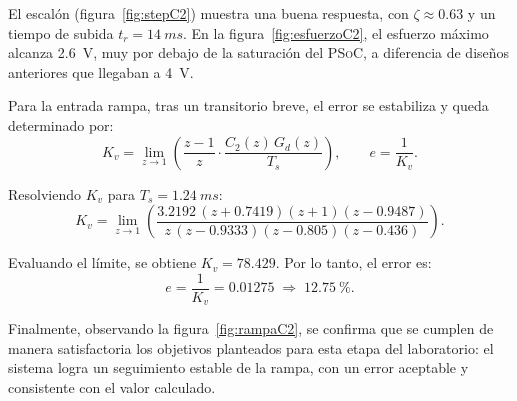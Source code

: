 
El escalón (figura~\ref{fig:stepC2}) muestra una buena respuesta, con $\zeta \approx 0.63$ y un tiempo de subida $t_r = \SI{14}{ms}$. En la figura~\ref{fig:esfuerzoC2}, el esfuerzo máximo alcanza \SI{2.6}{V}, muy por debajo de la saturación del \textsc{PSoC}, a diferencia de diseños anteriores que llegaban a \SI{4}{V}.  

Para la entrada rampa, tras un transitorio breve, el error se estabiliza y queda determinado por:
\[
K_v = \lim_{z \to 1} \left( \frac{z-1}{z} \cdot \frac{C_2(z)\, G_d(z)}{T_s} \right),
\qquad
e = \frac{1}{K_v}.
\]

Resolviendo $K_v$ para $T_s = \SI{1.24}{ms}$:
\[
K_v = \lim_{z \to 1} \left( \frac{3.2192 \,(z + 0.7419)(z + 1)(z - 0.9487)}
{z \,(z - 0.9333)(z - 0.805)(z - 0.436)} \right).
\]

Evaluando el límite, se obtiene $K_v = 78.429$. Por lo tanto, el error es:
\[
e = \frac{1}{K_v} = 0.01275 \;\Rightarrow\; \SI{12.75}{\percent}.
\]

Finalmente, observando la figura~\ref{fig:rampaC2}, se confirma que se cumplen de manera satisfactoria los objetivos planteados para esta etapa del laboratorio: el sistema logra un seguimiento estable de la rampa, con un error aceptable y consistente con el valor calculado.
